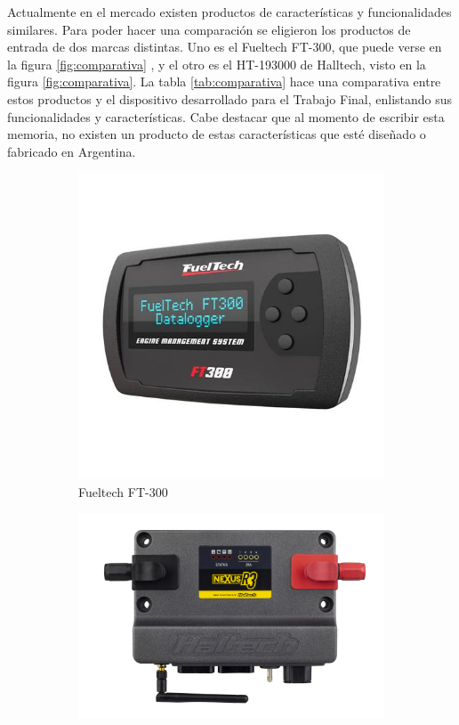 Actualmente en el mercado existen productos de características y funcionalidades similares. Para poder hacer una comparación se eligieron los productos de entrada de dos marcas distintas. Uno es el Fueltech FT-300, que puede verse en la figura \ref{fig:comparativa} ,  y el otro es el HT-193000 de Halltech, visto en la figura \ref{fig:comparativa}. La tabla \ref{tab:comparativa} hace una comparativa entre estos productos y el dispositivo desarrollado para el Trabajo Final, enlistando sus funcionalidades y características. Cabe destacar que al momento de escribir esta memoria, no existen un producto de estas características que esté diseñado o fabricado en Argentina.

\begin{figure}[htpb]
\centering
\begin{subfigure}{.4\textwidth}
\centering
\includegraphics[width=\textwidth]{./Figures/fueltech-ft300.jpg}
\caption{Fueltech FT-300}
\label{fig:fueltech}
\end{subfigure}
\hfill
\begin{subfigure}{.5\textwidth}
\centering
\includegraphics[width=\textwidth]{./Figures/HT-193000_00.JPG}

\end{subfigure}
\end{figure}
